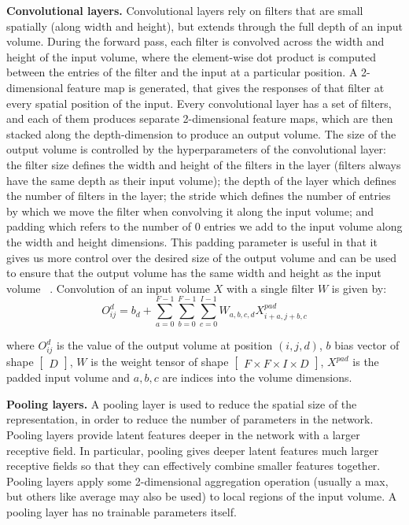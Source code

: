 \noindent \textbf{Convolutional layers.} Convolutional layers rely on filters that are small spatially (along width and height), but extends through the full depth of an input volume. During the forward pass, each filter is convolved across the width and height of the input volume, where the element-wise dot product is computed between the entries of the filter and the input at a particular position. A 2-dimensional feature map is generated, that gives the responses of that filter at every spatial position of the input. Every convolutional layer has a set of filters, and each of them produces separate 2-dimensional feature maps, which are then stacked along the depth-dimension to produce an output volume. The size of the output volume is controlled by the hyperparameters of the convolutional layer: the filter size defines the width and height of the filters in the layer (filters always have the same depth as their input volume); the depth of the layer which defines the number of filters in the layer; the stride which defines the number of entries by which we move the filter when convolving it along the input volume; and padding which refers to the number of 0 entries we add to the input volume along the width and height dimensions. This padding parameter is useful in that it gives us more control over the desired size of the output volume and can be used to ensure that the output volume has the same width and height as the input volume \unskip ~\citep{DLIndaba2017}. Convolution of an input volume $X$ with a single filter $W$ is given by: 
\begin{equation}
	O_{ij}^{d} = b_d + \sum_{a=0}^{F - 1}\sum_{b=0}^{F - 1}\sum_{c=0}^{I - 1}W_{a,b,c,d}X_{i+a,j+b,c}^{pad}
\end{equation}

\noindent where $O_{ij}^d$ is the value of the output volume at position $(i,j,d)$, $b$ bias vector of shape $\left [ \begin{matrix} D \end{matrix} \right]$, $W$ is the weight tensor of shape $\left [ \begin{matrix} F \times F \times I \times D \end{matrix} \right]$, $X^{pad}$ is the padded input volume and $a, b, c$ are indices into the volume dimensions. \par

\noindent \textbf{Pooling layers.} A pooling layer is used to reduce the spatial size of the representation, in order to reduce the number of parameters in the network. Pooling layers provide latent features deeper in the network with a larger receptive field. In particular, pooling gives deeper latent features much larger receptive fields so that they can effectively combine smaller features together. Pooling layers apply some 2-dimensional aggregation operation (usually a max, but others like average may also be used) to local regions of the input volume. A pooling layer has no trainable parameters itself. \par

